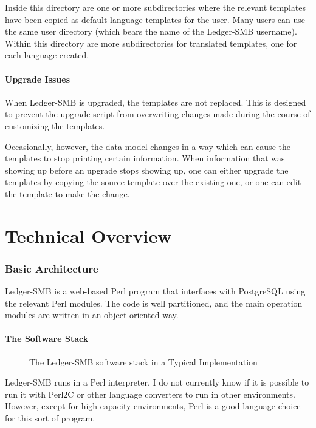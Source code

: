 \documentclass{article}
\begin{document}
Inside this directory are one or more subdirectories where the relevant
templates have been copied as default language templates for the user.  Many
users can use the same user directory (which bears the name of the Ledger-SMB
username).  Within this directory are more subdirectories for translated
templates, one for each language created.

\subsection{Upgrade Issues}
When Ledger-SMB is upgraded, the templates are not replaced.  This is designed
to prevent the upgrade script from overwriting changes made during the course of
customizing the templates.

Occasionally, however, the data model changes in a way which can cause the
templates to stop printing certain information.  When information that was
showing up before an upgrade stops showing up, one can either upgrade the
templates by copying the source template over the existing one, or one can edit
the template to make the change.

\clearpage
\part{Technical Overview}
\section{Basic Architecture}

Ledger-SMB is a web-based Perl program that interfaces with PostgreSQL using the
relevant Perl modules.  The code is well partitioned, and the main operation
modules are written in an object oriented way.

\subsection{The Software Stack}

\begin{figure}[hbtp]
\label{fig-sl-stack}

\caption{The Ledger-SMB software stack in a Typical Implementation}
\end{figure}

Ledger-SMB runs in a Perl interpreter.  I do not currently know if it is
possible to run it with Perl2C or other language converters to run in other
environments.  However, except for high-capacity environments, Perl is a good
language choice for this sort of program.
\end{document}
